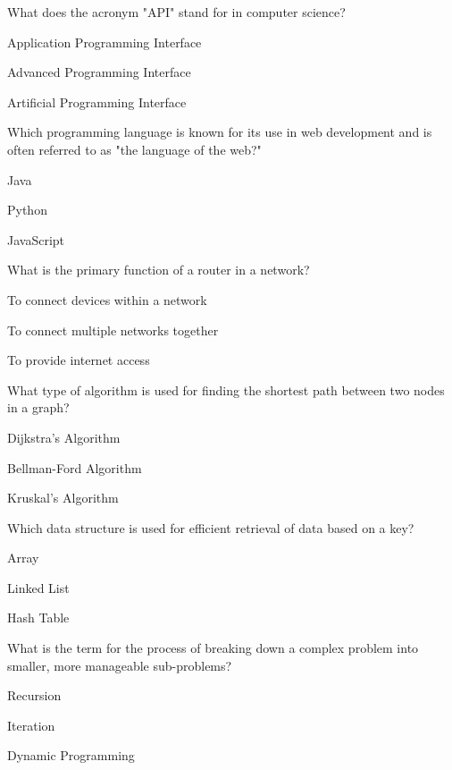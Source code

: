 
\begin{enhancedmcq}{What does the acronym "API" stand for in computer science?}
\item Application Programming Interface
\item Advanced Programming Interface
\item Artificial Programming Interface

\end{enhancedmcq}
\begin{enhancedmcq}{Which programming language is known for its use in web development and is often referred to as "the language of the web?"}
\item Java
\item Python
\item JavaScript

\end{enhancedmcq}
\begin{enhancedmcq}{What is the primary function of a router in a network?}
\item To connect devices within a network
\item To connect multiple networks together
\item To provide internet access

\end{enhancedmcq}
\begin{enhancedmcq}{What type of algorithm is used for finding the shortest path between two nodes in a graph?}
\item Dijkstra's Algorithm
\item Bellman-Ford Algorithm
\item Kruskal's Algorithm

\end{enhancedmcq}
\begin{enhancedmcq}{Which data structure is used for efficient retrieval of data based on a key?}
\item Array
\item Linked List
\item Hash Table

\end{enhancedmcq}
\begin{enhancedmcq}{What is the term for the process of breaking down a complex problem into smaller, more manageable sub-problems?}
\item Recursion
\item Iteration
\item Dynamic Programming

\end{enhancedmcq}
